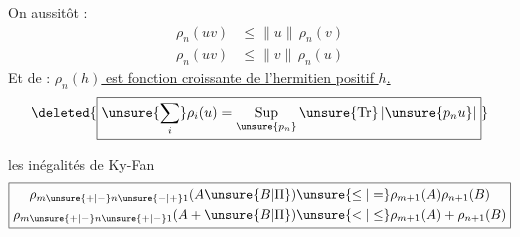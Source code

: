 On   aussitôt :
\[
\boxed{\begin{aligned}
\rho_n(uv)&\leq\lVert u\rVert\,\rho_n(v)\\
\rho_n(uv)&\leq\lVert v\rVert\,\rho_n(u)
\end{aligned}}
\]
Et de  : \uline{$\rho_n(h)$ est fonction croissante de l'hermitien positif $h$.}   
\[
\deleted{\boxed{\unsure{\sum_i}\rho_i(u)=\mathop{\rm Sup}\limits_{\unsure{p_n}}\unsure{\mathrm{Tr}}\,\lvert\unsure{p_nu}\rvert}}
\]

  les inégalités de Ky-Fan
\[
\boxed{\begin{aligned}
\rho_{m\unsure{+|-}n\unsure{-|+}1}(A\unsure{B|\Pi})&\unsure{\leq|=}\rho_{m+1}(A)\rho_{n+1}(B)\\
\rho_{m\unsure{+|-}n\unsure{+|-}1}(A+\unsure{B|\Pi})&\unsure{<|\leq}\rho_{m+1}(A)+\rho_{n+1}(B)
\end{aligned}}
\]

